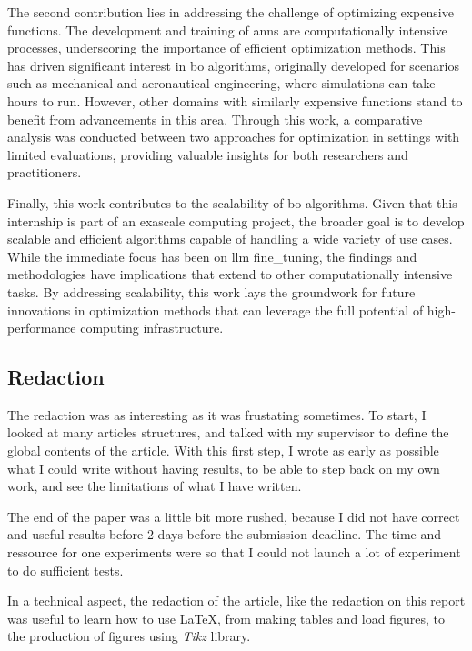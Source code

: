 The second contribution lies in addressing the challenge of optimizing expensive functions. The development and training of \acrshort{ann}s are computationally intensive processes, underscoring the importance of efficient optimization methods. This has driven significant interest in \acrshort{bo} algorithms, originally developed for scenarios such as mechanical and aeronautical engineering, where simulations can take hours to run. However, other domains with similarly expensive functions stand to benefit from advancements in this area. Through this work, a comparative analysis was conducted between two approaches for optimization in settings with limited evaluations, providing valuable insights for both researchers and practitioners.

Finally, this work contributes to the scalability of \acrshort{bo} algorithms. Given that this internship is part of an exascale computing project, the broader goal is to develop scalable and efficient algorithms capable of handling a wide variety of use cases. While the immediate focus has been on \acrshort{llm} \gls{fine_tuning}, the findings and methodologies have implications that extend to other computationally intensive tasks. By addressing scalability, this work lays the groundwork for future innovations in optimization methods that can leverage the full potential of high-performance computing infrastructure.


\subsection{Redaction}
\label{sec:redaction}

The redaction was as interesting as it was frustating sometimes. To start, I looked at many articles structures, and talked with my supervisor to define the global contents of the article. With this first step, I wrote as early as possible what I could write without having results, to be able to step back on my own work, and see the limitations of what I have written. 

The end of the paper was a little bit more rushed, because I did not have correct and useful results before 2 days before the submission deadline. The time and ressource for one experiments were so that I could not launch a lot of experiment to do sufficient tests. 

In a technical aspect, the redaction of the article, like the redaction on this report was useful to learn how to use \LaTeX{}, from making tables and load figures, to the production of figures using \textit{Tikz} library. 


